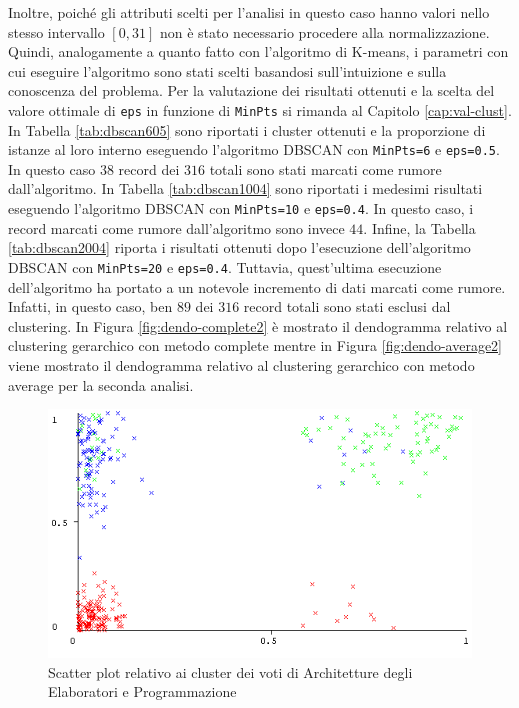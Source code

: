 \documentclass[12pt]{article}
\begin{document}
Inoltre, poiché gli attributi scelti per l'analisi in questo caso hanno valori nello stesso intervallo $[0,31]$ non è stato necessario procedere alla normalizzazione. 
Quindi, analoga\-mente a quanto fatto con l'algoritmo di K-means, i parametri con cui eseguire l'algoritmo sono stati scelti basandosi sull'intuizione e sulla conoscenza del problema. 
Per la valutazione dei risultati ottenuti e la scelta del valore ottimale di \texttt{eps} in funzione di \texttt{MinPts} si rimanda al Capitolo \ref{cap:val-clust}. 
In Tabella \ref{tab:dbscan605} sono riportati i cluster ottenuti e la proporzione di istanze al loro interno eseguendo l'algoritmo DBSCAN con \texttt{MinPts=6} e \texttt{eps=0.5}. 
In questo caso $38$ record dei $316$ totali sono stati marcati come rumore dall'algoritmo. 
In Tabella \ref{tab:dbscan1004} sono riportati i medesimi risultati eseguendo l'algoritmo DBSCAN con \texttt{MinPts=10} e \texttt{eps=0.4}. 
In questo caso, i record marcati come rumore dall'algoritmo sono invece $44$. 
Infine, la Tabella \ref{tab:dbscan2004} riporta i risultati ottenuti dopo l'esecuzione dell'algoritmo DBSCAN con \texttt{MinPts=20} e \texttt{eps=0.4}. 
Tut\-tavia, quest'ultima esecuzione dell'algoritmo ha portato a un notevole incre\-mento di dati marcati come rumore. Infatti, in questo caso, ben $89$ dei $316$ record totali sono stati esclusi dal clustering. In Figura \ref{fig:dendo-complete2} è mostrato il dendogramma relativo al clustering gerarchico con metodo complete mentre in Figura \ref{fig:dendo-average2} viene mostrato il dendogramma relativo al clustering gerarchico con metodo average per la seconda analisi. 
\begin{figure}[H]
	\includegraphics[width=\textwidth]{img/ARC-PRG-Cluster.png}
	\captionsetup{justification=centering}
	\caption{Scatter plot relativo ai cluster dei voti di Architetture degli Elaboratori e Programmazione}
	\label{APC}
\end{figure}
\end{document}
